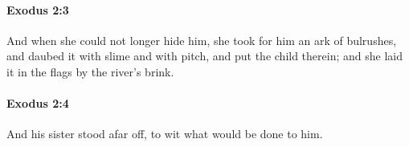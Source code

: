 		\paragraph{Exodus 2:3} %
			\label{EXODUS-2-3}

			And when she could not longer hide him, she took for him an ark of bulrushes, and daubed it with slime and with pitch, and put the child therein; and she laid it in the flags by the river's brink.


		\paragraph{Exodus 2:4} %
			\label{EXODUS-2-4}

			And his sister stood afar off, to wit what would be done to him.


